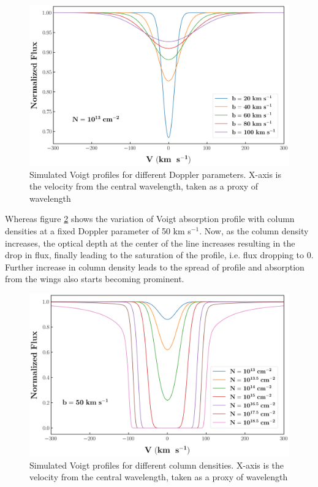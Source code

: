 \begin{figure}[!h]
    \centering
    \includegraphics[width=\linewidth]{Figures/Voigt-b.png}
    \caption{Simulated Voigt profiles for different Doppler parameters. X-axis is the velocity from the central wavelength, taken as a proxy of wavelength}
    \label{fig:Voigt-b}
\end{figure}

Whereas figure \ref{fig:Voigt-N} shows the variation of Voigt absorption profile with column densities at a fixed Doppler parameter of 50 km s$^{-1}$. Now, as the column density increases, the optical depth at the center of the line increases resulting in the drop in flux, finally leading to the saturation of the profile, i.e. flux dropping to 0. Further increase in column density leads to the spread of profile and absorption from the wings also starts becoming prominent.

\begin{figure}[!t]
    \centering
    \includegraphics[width=\linewidth]{Figures/Voigt-N.png}
    \caption{Simulated Voigt profiles for different column densities. X-axis is the velocity from the central wavelength, taken as a proxy of wavelength}
    \label{fig:Voigt-N}
\end{figure}


